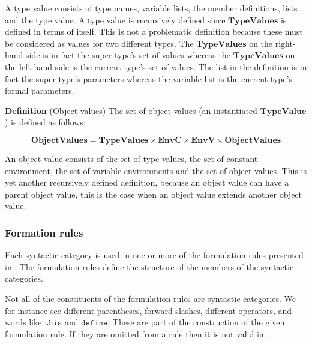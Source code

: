 A type value consists of type names, variable lists, the member definitions,
lists and the type value. A type value is recursively defined since
$\mathbf{TypeValues}$ is defined in terms of itself. This is not a problematic
definition because these must be considered as values for two different types.
The $\mathbf{TypeValues}$ on the right-hand side is in fact the super type's set
of values whereas the $\mathbf{TypeValues}$ on the left-hand side is the current
type's set of values.  The list in the definition is in fact the super type's
parameters whereas the variable list is the current type's formal parameters.

\textbf{Definition} (Object values) \hspace{0.5cm} The set of object values (an instantiated $\mathbf{TypeValue}$) is
defined as follows:

\[
  \mathbf{ObjectValues} = \mathbf{TypeValues} \times \mathbf{EnvC} \times
  \mathbf{EnvV} \times \mathbf{ObjectValues}
\]

An object value consists of the set of type values, the set of constant
environment, the set of variable environments and the set of object values. This
is yet another recursively defined definition, because an object value can have a parent object value, this is the case when an object value extends another object value. 


\subsubsection{Formation rules}
Each syntactic category is used in one or more of the formulation rules
presented in . The formulation rules define the structure
of the members of the syntactic categories. 

Not all of the constituents of the formulation rules are syntactic categories. We
for instance see different parentheses, forward slashes, different operators, and
words like $\texttt{this}$ and $\texttt{define}$. These are part of the
construction of the given formulation rule. If they are omitted from a rule then
it is not valid in \productname{}.

